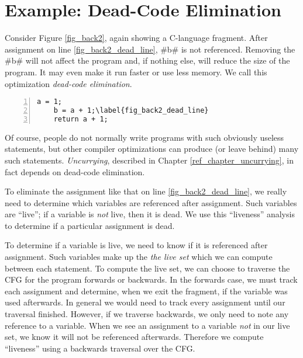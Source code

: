 \documentclass[12pt]{report}
\begin{document}
\section{Example: Dead-Code Elimination}
\label{sec_back2}

Consider Figure \ref{fig_back2}, again showing a C-language fragment.
After assignment on line \ref{fig_back2_dead_line}, #b# is not
referenced. Removing the #b# will not affect the program and,
if nothing else, will reduce the size of the program. It may even make
it run faster or use less memory. We call this optimization
\emph{dead-code elimination}.

\begin{myfig}[ht]
\begin{minipage}{1in}
  \begin{Verbatim}[numbers=left,commandchars=\\\{\}]
    a = 1;
    b = a + 1;\label{fig_back2_dead_line}
    return a + 1;
  \end{Verbatim}
\end{minipage}
\caption{A C-language fragment illustrating \emph{dead code}. After
assignment on line \ref{fig_back2_dead_line}, \verb=b= is not used
and can be considered ``dead.''}
\label{fig_back2}
\end{myfig}

Of course, people do not normally write programs with such obviously
useless statements, but other compiler optimizations can produce (or
leave behind) many such statements. \emph{Uncurrying}, described in
Chapter \ref{ref_chapter_uncurrying}, in fact depends on dead-code elimination.

To eliminate the assignment like that on line
\ref{fig_back2_dead_line}, we really need to determine which variables
are referenced after assignment. Such variables are ``live''; if a
variable is \emph{not} live, then it is dead. We use this ``liveness''
analysis to determine if a particular assignment is dead.

To determine if a variable is live, we need to know if it is
referenced after assignment.  Such variables make up the \emph{the
  live set} which we can compute between each statement. To compute
the live set, we can choose to traverse the CFG for the program forwards or
backwards.  In the forwards case, we must track each assignment and
determine, when we exit the fragment, if the variable was used
afterwards. In general we would need to track every assignment until
our traversal finished. However, if we traverse backwards, we only
need to note any reference to a variable. When we see an assignment to
a variable \emph{not} in our live set, we know it will not be
referenced afterwards. Therefore we compute ``liveness'' using a
backwards traversal over the CFG.
\end{document}
